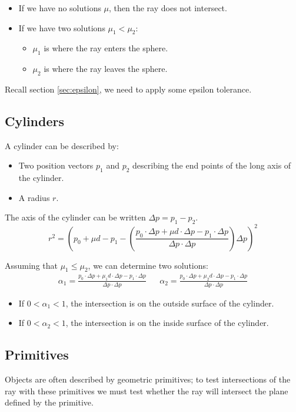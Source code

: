 \documentclass[11pt]{article}
\begin{document}
\begin{itemize}
  \item If we have no solutions $\mu$, then the ray does not intersect.
  \item If we have two solutions $\mu_1 < \mu_2$:
    \begin{itemize}
      \item $\mu_1$ is where the ray enters the sphere.
      \item $\mu_2$ is where the ray leaves the sphere.
    \end{itemize}
\end{itemize}

Recall section \ref{sec:epsilon}, we need to apply some epsilon tolerance.

\subsection{Cylinders}
A cylinder can be described by:
\begin{itemize}
  \item Two position vectors $p_1$ and $p_2$ describing the end points of the long axis of the cylinder.
  \item A radius $r$.
\end{itemize}
The axis of the cylinder can be written $\Delta p = p_1 - p_2$.
\[
  r^2 = \left( p_0 + \mu d - p_1 - \left( \frac{p_0 \cdot \Delta p + \mu d \cdot \Delta p - p_1 \cdot \Delta p}{\Delta p \cdot \Delta p} \right) \Delta p \right)^2
\]

Assuming that $\mu_1 \leq \mu_2$, we can determine two solutions:
\begin{align*}
  \alpha_1 = \frac{p_0 \cdot \Delta p + \mu_1 d \cdot \Delta p - p_1 \cdot \Delta p}{\Delta p \cdot \Delta p}
  &&
  \alpha_2 = \frac{p_0 \cdot \Delta p + \mu_2 d \cdot \Delta p - p_1 \cdot \Delta p}{\Delta p \cdot \Delta p}
\end{align*}
\begin{itemize}
  \item If $0 < \alpha_1 < 1$, the intersection is on the outside surface of the cylinder.
  \item If $0 < \alpha_2 < 1$, the intersection is on the inside surface of the cylinder.
\end{itemize}

\subsection{Primitives}
Objects are often described by geometric primitives; to test intersections of the ray with these primitives we must test whether the ray will intersect the plane defined by the primitive.
\end{document}
